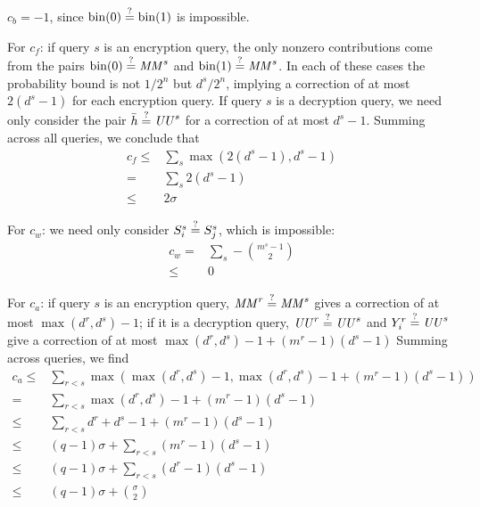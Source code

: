 \documentclass[hctr2.tex]{subfiles}
\begin{document}
\(c_b = -1\), since 
\(\operatorname{bin}(0) \stackrel{\text{?}}{=} \operatorname{bin}(1)\) is impossible.

For \(c_f\): if query \(s\) is an encryption query,
the only nonzero contributions come from the pairs
\(\operatorname{bin}(0) \stackrel{\text{?}}{=} \mathit{MM}^s\) and
\(\operatorname{bin}(1) \stackrel{\text{?}}{=} \mathit{MM}^s\). In each of these
cases the probability bound is not \(1/2^n\) but
\(d^s/2^n\), implying a correction of at most
\(2(d^s - 1)\) for each encryption query.
If query \(s\) is a decryption query,
we need only consider the pair \(\bar{h} \stackrel{\text{?}}{=} \mathit{UU}^s\)
for a correction of at most \(d^s - 1\). 
Summing across all queries, we conclude that
\begin{align*}
    c_f \leq &\sum_s \max(2(d^s - 1), d^s - 1) \\
        = &\sum_s 2(d^s - 1) \\
        \leq & 2\sigma
\end{align*}

For \(c_w\): we need only consider \(S_i^s \stackrel{\text{?}}{=} S_j^s\),
which is impossible:
\begin{align*}
    c_w = &\sum_s -\binom{m^s -1}{2} \\
        \leq &0
\end{align*}

For \(c_a\): if query \(s\) is an encryption query,
\(\mathit{MM}^r \stackrel{\text{?}}{=} \mathit{MM}^s\) gives a correction of
at most \(\max(d^r, d^s) -1\);
if it is a decryption query,
\(\mathit{UU}^r \stackrel{\text{?}}{=} \mathit{UU}^s\) and \(Y_i^r \stackrel{\text{?}}{=} \mathit{UU}^s\)
give a correction of at most
\(\max(d^r, d^s) -1 + (m^r -1 )(d^s -1)\)
Summing across queries, we find
\begin{align*}
    c_a \leq &\sum_{r<s} \max(\max(d^r, d^s) -1, \max(d^r, d^s) -1 + (m^r -1 )(d^s -1)) \\
           = &\sum_{r<s} \max(d^r, d^s) -1 + (m^r -1 )(d^s -1) \\
        \leq & \sum_{r < s} d^r + d^s -1 + (m^r -1 )(d^s -1)\\
        \leq & (q-1)\sigma + \sum_{r < s} (m^r -1 )(d^s -1) \\
        \leq & (q-1)\sigma + \sum_{r < s} (d^r -1)(d^s -1) \\
        \leq & (q-1)\sigma + \binom{\sigma}{2}
\end{align*}
\end{document}
